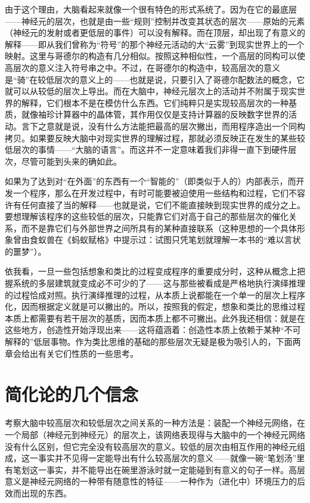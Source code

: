 由于这个理由，大脑看起来就像一个很有特色的形式系统了。因为在它的最底层——神经元的层次，也就是由一些“规则”控制并改变其状态的层次——原始的元素（神经元的发射或者更低层的事件）可以没有解释。而在顶层，却出现了有意义的解释——即从我们曾称为“符号”的那个神经元活动的大“云雾”到现实世界上的一个映射。这里与哥德尔的构造有几分相似。按照这种相似性，一个高层的同构可以使高层次的意义注入符号串之中。不过，在哥德尔的构造中，较高层次的意义是“骑”在较低层次的意义上的——也就是说，只要引入了哥德尔配数法的概念，它就可以从较低的层次上导出。而在大脑中，神经元层次上的活动并不附属于现实世界的解释，它们根本不是在模仿什么东西。它们纯粹只是实现较高层次的一种基质，就像袖珍计算器中的晶体管，其作用仅仅是支持计算器的反映数字世界的活动。言下之意就是说，没有什么方法能把最高的层次撇出，而用程序造出一个同构拷贝。如果要反映大脑中对现实世界的理解过程，那就必须反映正在发生的某些较低层次的事情——“大脑的语言”。而这并不一定意味着我们非得一直下到硬件层次，尽管可能到头来的确如此。

如果为了达到对“在外面”的东西有一个“智能的”（即类似于人的）内部表示，而开发一个程序，那么在开发过程中，有时可能要被迫使用一些结构和过程，它们不容许有任何直接了当的解释——也就是说，它们不能直接映到现实世界的成分之上。要想理解该程序的这些较低的层次，只能靠它们对高于自己的那些层次的催化关系，而不是靠它们与外部世界之间所具有的某种直接联系（这种思想的一个具体形象曾由食蚁兽在《蚂蚁赋格》中提示过：试图只凭笔划就理解一本书的“难以言状的噩梦”）。

依我看，一旦一些包括想象和类比的过程变成程序的重要成分时，这种从概念上把握系统的多层建筑就变成必不可少的了——这与那些被看成是严格地执行演绎推理的过程恰成对照。执行演绎推理的过程，从本质上说都能在一个单一的层次上程序化，因而根据定义就是可以撇出的。所以，按照我的假定，想象和类比的思维过程本质上都需要有若干层次的基质，因而本质上都不可撇出。此外我还相信：就是在这些地方，创造性开始浮现出来——这将蕴涵着：创造性本质上依赖于某种“不可解释的”低层事物。作为类比思维的基础的那些层次无疑是极为吸引人的，下面两章会给出有关它们性质的一些思考。

\section{简化论的几个信念}

考察大脑中较高层次和较低层次之间关系的一种方法是：装配一个神经元网络，在一个局部（神经元到神经元）的层次上，该网络表现得与大脑中的一个神经元网络没有什么区别，但它完全没有较高层次的意义。较低的层次由相互作用的神经元组成，这一事实并不见得一定能导出有什么较高层次的意义——就像一碗“笔划汤”里有笔划这一事实，并不能导出在碗里游泳时就一定能碰到有意义的句子一样。高层意义是神经元网络的一种带有随意性的特征——一种作为（进化中）环境压力的后效而出现的东西。

